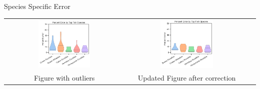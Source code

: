 \begin{frame}{Species Specific Error}
    \centering
    \begin{tabular}{ccc}
        \includegraphics[width=0.45\textwidth]{images/species_plot_outdated.png} &
        \includegraphics[width=0.45\textwidth]{images/new_species_plot_2.png} \\
        \small Figure with outliers & \small Updated Figure after correction\\
    \end{tabular}
\end{frame}

